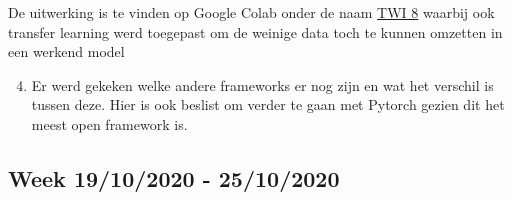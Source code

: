 \documentclass{article}
\begin{document}
			De uitwerking is te vinden op Google Colab onder de naam \href{https://colab.research.google.com/drive/1qR4reWAIvIs59eZKWSmZHboZ1gjGA4jS}{TWI 8} waarbij ook transfer learning werd toegepast om de weinige data toch te kunnen omzetten in een werkend model
			
\begin{enumerate}[1]
\setcounter{enumi}{3}
\item Er werd gekeken welke andere frameworks er nog zijn en wat het verschil is tussen deze. Hier is ook beslist om verder te gaan met Pytorch gezien dit het meest open framework is. 
\end{enumerate}


\subsection{Week 19/10/2020 - 25/10/2020}
\end{document}
